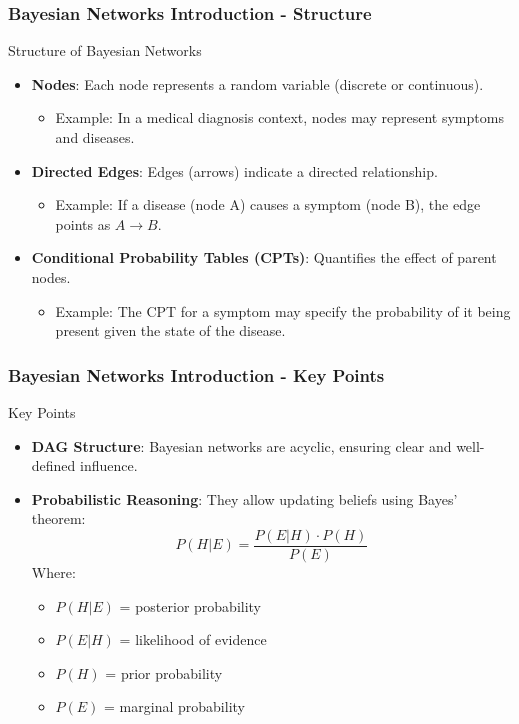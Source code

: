 \documentclass[aspectratio=169]{beamer}
\begin{document}
\begin{frame}[fragile]
    \frametitle{Bayesian Networks Introduction - Structure}
    \begin{block}{Structure of Bayesian Networks}
        \begin{itemize}
            \item \textbf{Nodes}: Each node represents a random variable (discrete or continuous).
            \begin{itemize}
                \item Example: In a medical diagnosis context, nodes may represent symptoms and diseases.
            \end{itemize}
            \item \textbf{Directed Edges}: Edges (arrows) indicate a directed relationship.
            \begin{itemize}
                \item Example: If a disease (node A) causes a symptom (node B), the edge points as \(A \rightarrow B\).
            \end{itemize}
            \item \textbf{Conditional Probability Tables (CPTs)}: Quantifies the effect of parent nodes.
            \begin{itemize}
                \item Example: The CPT for a symptom may specify the probability of it being present given the state of the disease.
            \end{itemize}
        \end{itemize}
    \end{block}
\end{frame}

\begin{frame}[fragile]
    \frametitle{Bayesian Networks Introduction - Key Points}
    \begin{block}{Key Points}
        \begin{itemize}
            \item \textbf{DAG Structure}: Bayesian networks are acyclic, ensuring clear and well-defined influence.
            \item \textbf{Probabilistic Reasoning}: They allow updating beliefs using Bayes' theorem:
            \begin{equation}
                P(H|E) = \frac{P(E|H) \cdot P(H)}{P(E)}
            \end{equation}
            Where:
            \begin{itemize}
                \item \(P(H|E)\) = posterior probability
                \item \(P(E|H)\) = likelihood of evidence
                \item \(P(H)\) = prior probability
                \item \(P(E)\) = marginal probability
            \end{itemize}
        \end{itemize}
    \end{block}
\end{frame}
\end{document}
